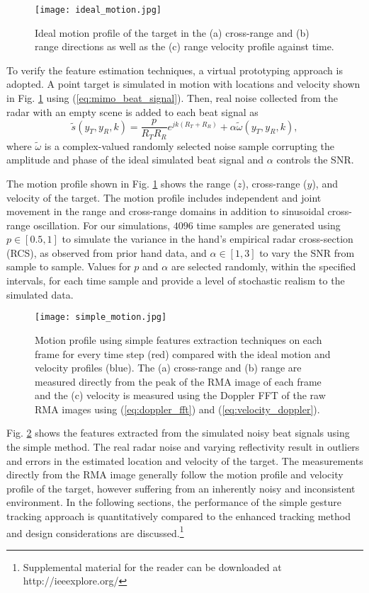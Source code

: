 \documentclass[10pt,journal,final]{IEEEtran}
\begin{document}
\begin{figure}[h]
	\centering
	\texttt{[image: ideal\_motion.jpg]}
	\caption{Ideal motion profile of the target in the (a) cross-range and (b) range directions as well as the (c) range velocity profile against time.}
	\label{fig:ideal_motion}
\end{figure}

To verify the feature estimation techniques, a virtual prototyping approach is adopted. A point target is simulated in motion with locations and velocity shown in Fig. \ref{fig:ideal_motion} using (\ref{eq:mimo_beat_signal}). Then, real noise collected from the radar with an empty scene is added to each beat signal as
\begin{equation}
	\tilde{s}(y_T,y_R,k) = \frac{p}{R_T R_R}e^{jk(R_T + R_R)} + \alpha \tilde{ \omega}(y_T,y_R,k),
\end{equation}
where $\tilde{ \omega}$ is a complex-valued randomly selected noise sample corrupting the amplitude and phase of the ideal simulated beat signal and $\alpha$ controls the SNR.

The motion profile shown in Fig. \ref{fig:ideal_motion} shows the range ($z$), cross-range ($y$), and velocity of the target. The motion profile includes independent and joint movement in the range and cross-range domains in addition to sinusoidal cross-range oscillation. For our simulations, $4096$ time samples are generated using $p \in [0.5,1]$ to simulate the variance in the hand's empirical radar cross-section (RCS), as observed from prior hand data, and $\alpha \in [1,3]$ to vary the SNR from sample to sample. Values for $p$ and $\alpha$ are selected randomly, within the specified intervals, for each time sample and provide a level of stochastic realism to the simulated data.

\begin{figure}[h]
	\centering
	\texttt{[image: simple\_motion.jpg]}
	\caption{Motion profile using simple features extraction techniques on each frame for every time step (red) compared with the ideal motion and velocity profiles (blue). The (a) cross-range and (b) range are measured directly from the peak of the RMA image of each frame and the (c) velocity is measured using the Doppler FFT of the raw RMA images using (\ref{eq:doppler_fft}) and (\ref{eq:velocity_doppler}).}
	\label{fig:simple_motion}
\end{figure}

Fig. \ref{fig:simple_motion} shows the features extracted from the simulated noisy beat signals using the simple method. The real radar noise and varying reflectivity result in outliers and errors in the estimated location and velocity of the target. The measurements directly from the RMA image generally follow the motion profile and velocity profile of the target, however suffering from an inherently noisy and inconsistent environment. In the following sections, the performance of the simple gesture tracking approach is quantitatively compared to the enhanced tracking method and design considerations are discussed.\footnote{Supplemental material for the reader can be downloaded at http://ieeexplore.org/}
\end{document}

